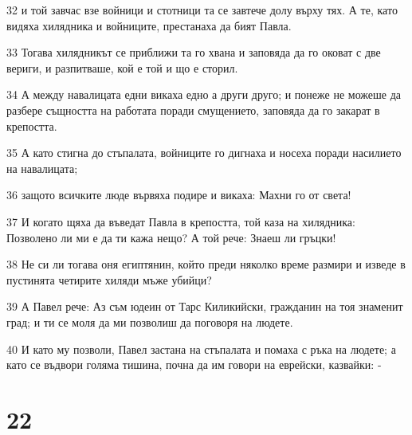 \par 32 и той завчас взе войници и стотници та се завтече долу върху тях. А те, като видяха хилядника и войниците, престанаха да бият Павла.
\par 33 Тогава хилядникът се приближи та го хвана и заповяда да го оковат с две вериги, и разпитваше, кой е той и що е сторил.
\par 34 А между навалицата едни викаха едно а други друго; и понеже не можеше да разбере същността на работата поради смущението, заповяда да го закарат в крепостта.
\par 35 А като стигна до стъпалата, войниците го дигнаха и носеха поради насилието на навалицата;
\par 36 защото всичките люде вървяха подире и викаха: Махни го от света!
\par 37 И когато щяха да въведат Павла в крепостта, той каза на хилядника: Позволено ли ми е да ти кажа нещо? А той рече: Знаеш ли гръцки!
\par 38 Не си ли тогава оня египтянин, който преди няколко време размири и изведе в пустинята четирите хиляди мъже убийци?
\par 39 А Павел рече: Аз съм юдеин от Тарс Киликийски, гражданин на тоя знаменит град; и ти се моля да ми позволиш да поговоря на людете.
\par 40 И като му позволи, Павел застана на стъпалата и помаха с ръка на людете; а като се въдвори голяма тишина, почна да им говори на еврейски, казвайки: -

\chapter{22}

